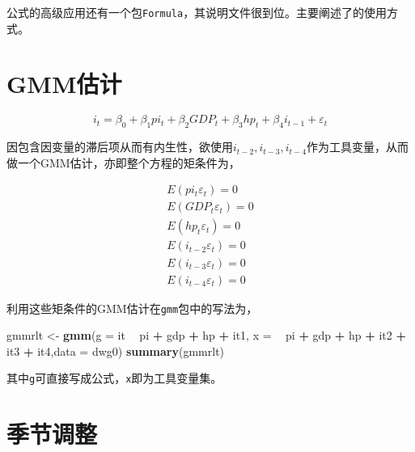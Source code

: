 \documentclass[
]{book}
\newenvironment{Shaded}{\begin{snugshade}}{\end{snugshade}}
\newcommand{\DataTypeTok}[1]{\textcolor[rgb]{0.13,0.29,0.53}{#1}}
\newcommand{\KeywordTok}[1]{\textcolor[rgb]{0.13,0.29,0.53}{\textbf{#1}}}
\newcommand{\NormalTok}[1]{#1}
\newcommand{\OperatorTok}[1]{\textcolor[rgb]{0.81,0.36,0.00}{\textbf{#1}}}
\newcommand{\StringTok}[1]{\textcolor[rgb]{0.31,0.60,0.02}{#1}}
\begin{document}
公式的高级应用还有一个包\texttt{Formula}，其说明文件很到位。主要阐述了\texttt{\textbar{}}的使用方式。

\hypertarget{gmmux4f30ux8ba1}{%
\section{GMM估计}\label{gmmux4f30ux8ba1}}

\[
i _t =\beta_0 + \beta_1pi_t + \beta_2GDP_t + \beta_3hp_t + \beta_4i_{t-1} + \varepsilon_t
\]

因包含因变量的滞后项从而有内生性，欲使用\(i_{t-2},i_{t-3},i_{t-4}\)作为工具变量，从而做一个GMM估计，亦即整个方程的矩条件为，

\begin{align}
E(pi_t\varepsilon_t) = 0\\

E(GDP_t\varepsilon_t) = 0\\

E(hp_t\varepsilon_t) = 0\\

E(i_{t-2}\varepsilon_t) = 0\\

E(i_{t-3}\varepsilon_t) = 0\\

E(i_{t-4}\varepsilon_t) = 0
\end{align}

利用这些矩条件的GMM估计在\texttt{gmm}包中的写法为，

\begin{Shaded}
\begin{Highlighting}[]
\NormalTok{gmmrlt <-}\StringTok{ }\KeywordTok{gmm}\NormalTok{(}\DataTypeTok{g =}\NormalTok{ it }\OperatorTok{~}\StringTok{ }\NormalTok{pi }\OperatorTok{+}\StringTok{ }\NormalTok{gdp }\OperatorTok{+}\StringTok{ }\NormalTok{hp }\OperatorTok{+}\StringTok{ }\NormalTok{it1, }\DataTypeTok{x =} \OperatorTok{~}\StringTok{ }\NormalTok{pi }\OperatorTok{+}\StringTok{ }\NormalTok{gdp }\OperatorTok{+}\StringTok{ }\NormalTok{hp }\OperatorTok{+}\StringTok{ }\NormalTok{it2 }\OperatorTok{+}\StringTok{ }\NormalTok{it3 }\OperatorTok{+}\StringTok{ }\NormalTok{it4,}\DataTypeTok{data =}\NormalTok{ dwg0)}
\KeywordTok{summary}\NormalTok{(gmmrlt)}
\end{Highlighting}
\end{Shaded}

其中\texttt{g}可直接写成公式，\texttt{x}即为工具变量集。

\hypertarget{ux5b63ux8282ux8c03ux6574}{%
\section{季节调整}\label{ux5b63ux8282ux8c03ux6574}}
\end{document}
